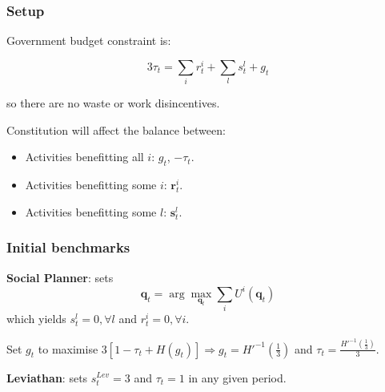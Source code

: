 \documentclass[11pt,aspectratio=169]{beamer}
\begin{document}
\begin{frame}
\frametitle{Setup}

\noindent Government budget constraint is: 

$$3\tau_t = \sum_i r_t^i + \sum_l s_t^l + g_t$$  

so there are no waste or work disincentives.

\bigskip 

Constitution will affect the balance between:
\begin{itemize}
\item Activities benefitting all $i$: $g_t$, $-\tau_t$.
\item Activities benefitting some $i$: $\textbf{r}_t^i$.
\item Activities benefitting some $l$: $\textbf{s}_t^l$.
\end{itemize}

\end{frame}



\begin{frame}
\frametitle{Initial benchmarks}

\noindent \textbf{Social Planner}: sets $$\textbf{q}_t = \arg \max_{\textbf{q}_t} \sum_i U^i(\textbf{q}_t)$$  which yields $s_t^l=0, \forall l$ and $r_t^i=0, \forall i$.

Set $g_t$ to maximise $3[1-\tau_t + H(g_t)] \Rightarrow g_t = H'^{-1}(\frac{1}{3})$ and $\tau_t=\frac{H'^{-1}(\frac{1}{3})}{3}$.

\bigskip

\noindent \textbf{Leviathan}: sets $s_t^{Lev}=3$ and $\tau_t=1$ in any given period.

\end{frame}
\end{document}
